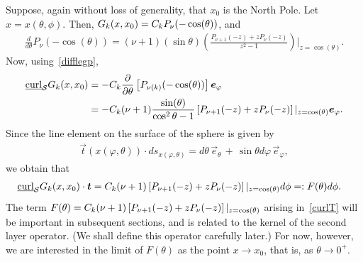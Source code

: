 Suppose, again without loss of generality, that $x_0$ is the North Pole.
Let $x=x(\theta,\phi)$. Then, $G_k(x,x_0) = C_k P_\nu(-\cos(\theta))$,
and
\begin{align}
  \label{difflegp} 
  \frac{d}{d\theta} P_\nu(-\cos(\theta)) =  
    (\nu+1)(\sin\theta) \left( \frac{ P_{\nu+1}(-z) +z
        P_{\nu}(-z)}{z^2-1} 
   \right)\vert_{z=\cos(\theta)}.
\end{align}
Now, using~\eqref{difflegp}, 
\begin{align*}
  \underline{\mbox{curl}}_{\S} G_k(x,x_0)&=-
  \C\frac{\partial}{\partial \theta} \left[P_{\nu(k)}(-\cos(\theta))
  \right] \vec{e}_\varphi \\
  &=-\C(\nu+1)\frac{\sin(\theta)}{\cos^2\theta -1} 
    \left[ P_{\nu+1}(-z) + 
   z 
    P_\nu(-z)\right]\vert_{z=\cos(\theta)} \vec{e}_\varphi. \\
\end{align*}
Since the line element on the surface of the sphere is given by
\begin{align*}
  \vec{t}(x(\varphi,\theta))\cdot ds_{x(\varphi,\theta)} = 
    d\theta\,\vec{e}_{\theta} \,+
    \, \sin\theta d\varphi \,\vec{e}_{\varphi}, 
\end{align*} 
we obtain that
\begin{align}
  \label{curlT}
  \underline{\mbox{curl}}_{\S} G_k(x,x_0)\cdot \vec{t} &= 
  \C (\nu+1)  \left[ P_{\nu+1}(-z) + 
  z P_\nu(-z)\right]\vert_{z=\cos(\theta)} d\phi =: F(\theta)d\phi.
\end{align}
The term $F(\theta)= C_k (\nu+1)  \left[ P_{\nu+1}(-z) + z
P_\nu(-z)\right]\vert_{z=\cos(\theta)}$ arising in~\eqref{curlT} will be
important in subsequent sections, and is related to the kernel of the
second layer operator. (We shall define this operator carefully later.)
For now, however, we are interested in the limit of $F(\theta)$ as the
point $x\rightarrow x_0$, that is, as $\theta \rightarrow 0^+$.  

